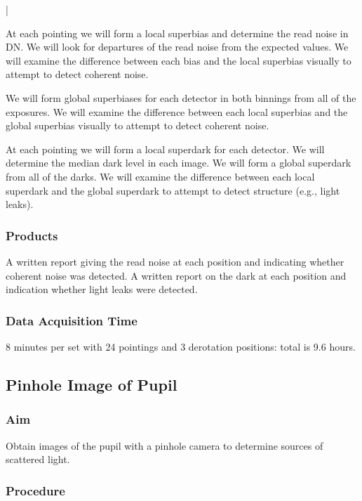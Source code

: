 |\documentclass{article}
\begin{document}
At each pointing we will form a local superbias and determine the read noise in DN. We will look for departures of the read noise from the expected values. We will examine the difference between each bias and the local superbias visually to attempt to detect coherent noise.

We will form global superbiases for each detector in both binnings from all of the exposures. We will examine the difference between each local superbias and the global superbias visually to attempt to detect coherent noise.

At each pointing we will form a local superdark for each detector. We will determine the median dark level in each image. We will form a global superdark from all of the darks. We will examine the difference between each local superdark and the global superdark to attempt to detect structure (e.g., light leaks).

\subsubsection{Products}

A written report giving the read noise at each position and indicating whether coherent noise was detected. A written report on the dark at each position and indication whether light leaks were detected.

\subsubsection{Data Acquisition Time}

8 minutes per set with 24 pointings and 3 derotation positions: total is 9.6 hours.


\subsection{Pinhole Image of Pupil}

\subsubsection{Aim}

Obtain images of the pupil with a pinhole camera to determine sources of scattered light.

\subsubsection{Procedure}
\end{document}
